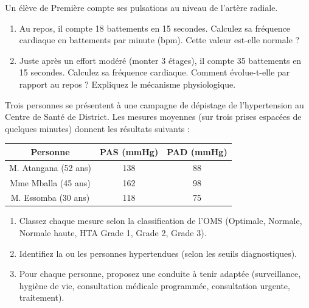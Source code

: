 \documentclass[11pt]{article}
\newcounter{popsec}
\newcounter{popsub}
\newcommand{\courssub}[1]{%
  \stepcounter{popsub}%
  \par\vspace{9pt}\noindent{\popxbold\fontsize{11.5}{13}\selectfont\color{popink}{\color{poporange}\thepopsec.\thepopsub}\hspace{6pt}#1}\par\nopagebreak\vspace{4pt}
}
\begin{document}
\begin{exercice}
Un élève de Première compte ses pulsations au niveau de l'artère radiale.
\begin{enumerate}
    \item Au repos, il compte 18 battements en 15 secondes. Calculez sa fréquence cardiaque en battements par minute (bpm). Cette valeur est-elle normale ?
    \item Juste après un effort modéré (monter 3 étages), il compte 35 battements en 15 secondes. Calculez sa fréquence cardiaque. Comment évolue-t-elle par rapport au repos ? Expliquez le mécanisme physiologique.
\end{enumerate}
\end{exercice}

\courssub{Je m'entraîne}

\begin{exercice}
Trois personnes se présentent à une campagne de dépistage de l'hypertension au Centre de Santé de District. Les mesures moyennes (sur trois prises espacées de quelques minutes) donnent les résultats suivants :
\begin{center}
\begin{tabular}{|c|c|c|}\hline
\textbf{Personne} & \textbf{PAS (mmHg)} & \textbf{PAD (mmHg)} \\ \hline
M. Atangana (52 ans) & 138 & 88 \\ \hline
Mme Mballa (45 ans) & 162 & 98 \\ \hline
M. Essomba (30 ans) & 118 & 75 \\ \hline
\end{tabular}
\end{center}
\begin{enumerate}
    \item Classez chaque mesure selon la classification de l'OMS (Optimale, Normale, Normale haute, HTA Grade 1, Grade 2, Grade 3).
    \item Identifiez la ou les personnes hypertendues (selon les seuils diagnostiques).
    \item Pour chaque personne, proposez une conduite à tenir adaptée (surveillance, hygiène de vie, consultation médicale programmée, consultation urgente, traitement).
\end{enumerate}
\end{exercice}
\end{document}
